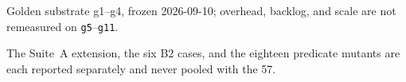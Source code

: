 Golden substrate g1--g4, frozen 2026-09-10; overhead, backlog, and scale
are not remeasured on \texttt{g5}--\texttt{g11}.



The Suite~A extension, the six B2 cases, and the eighteen predicate
mutants are each reported separately and never pooled with the 57.
